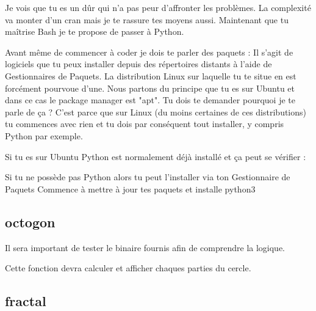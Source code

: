 \documentclass[a4paper, 12pt]{article}
\begin{document}
{\comfortaa
    Je vois que tu es un dûr qui n'a pas peur d'affronter les problèmes.
    La complexité va monter d'un cran mais je te rassure tes moyens aussi.
    \newline \newline
    Maintenant que tu maîtrise Bash je te propose de passer à Python.

    Avant même de commencer à coder je dois te parler des paquets :
    \newline \newline
    Il s'agit de logiciels que tu peux installer depuis des répertoires distants à l'aide
    de Gestionnaires de Paquets. La distribution Linux sur laquelle tu te situe en est
    forcément pourvoue d'une. Nous partons du principe que tu es sur Ubuntu et dans ce
    cas le package manager est "apt". Tu dois te demander pourquoi je te parle de ça ?
    \newline
    C'est parce que sur Linux (du moins certaines de ces distributions) tu commences avec rien
    et tu dois par conséquent tout installer, y compris Python par exemple.

    Si tu es sur Ubuntu Python est normalement déjà installé et ça peut se vérifier :


    Si tu ne possède pas Python alors tu peut l'installer via ton Gestionnaire de Paquets
    Commence à mettre à jour tes paquets et installe python3


    \subsection{octogon}


    Il sera important de tester le binaire fournis afin de comprendre la logique.

    Cette fonction devra calculer et afficher chaques parties du cercle.

    \subsection{fractal}

}
\end{document}
